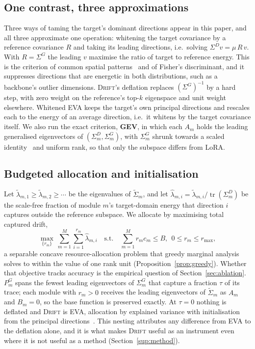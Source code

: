 \documentclass[conference]{IEEEtran}
\newcommand{\method}{\textsc{Drift}}
\newcommand{\tr}{\operatorname{tr}}
\begin{document}
\subsection{One contrast, three approximations}
\label{sec:family}

Three ways of taming the target's dominant directions appear in this paper, and
all three approximate one operation: whitening the target covariance by a
reference covariance $R$ and taking its leading directions, i.e.\ solving
$\Sigma^{D} v = \mu\, R\, v$. With $R = \Sigma^{G}$ the leading $v$ maximise the
ratio of target to reference energy. This is the criterion of common spatial
patterns~\cite{koles1990csp,ramoser2000csp} and of Fisher's discriminant, and it
suppresses directions that are energetic in both distributions, such as a
backbone's outlier dimensions. \method{}'s deflation replaces $(\Sigma^{G})^{-1}$
by a hard step, with zero weight on the reference's top-$k$ eigenspace and unit
weight elsewhere. Whitened EVA keeps the target's own principal directions and
rescales each to the energy of an average direction, i.e.\ it whitens by the
target covariance itself. We also run the exact criterion, \textbf{GEV}, in
which each $A_m$ holds the leading generalised eigenvectors of
$(\Sigma^{D}_m, \Sigma^{G}_m)$, with $\Sigma^{G}_m$ shrunk towards a scaled
identity~\cite{ledoit2004shrinkage} and uniform rank, so that only the subspace
differs from LoRA.

\subsection{Budgeted allocation and initialisation}
\label{sec:alloc}

Let $\widetilde{\lambda}_{m,1} \ge \widetilde{\lambda}_{m,2} \ge \cdots$ be the
eigenvalues of $\widetilde{\Sigma}_m$, and let
$\hat{\lambda}_{m,i} = \widetilde{\lambda}_{m,i}/\tr(\Sigma^{D}_m)$ be the
scale-free fraction of module $m$'s target-domain energy that direction $i$
captures outside the reference subspace. We allocate by maximising total captured
drift,
\begin{equation}
\max_{\{r_m\}} \ \sum_{m=1}^{M} \sum_{i=1}^{r_m} \hat{\lambda}_{m,i}
\quad \text{s.t.} \quad \sum_{m=1}^{M} r_m c_m \le B,\ \ 0 \le r_m \le r_{\max},
\label{eq:knapsack}
\end{equation}
a separable concave resource-allocation problem that greedy marginal analysis
solves to within the value of one rank unit (Proposition~\ref{prop:greedy}).
Whether that objective tracks accuracy is the empirical question of
Section~\ref{sec:ablation}. $P^{G}_m$ spans the fewest leading eigenvectors of
$\Sigma^{G}_m$ that capture a fraction $\tau$ of its trace; each module with
$r_m > 0$ receives the leading eigenvectors of $\widetilde{\Sigma}_m$ as $A_m$
and $B_m = 0$, so the base function is preserved exactly. At $\tau = 0$ nothing
is deflated and \method{} is EVA, allocation by explained variance with
initialisation from the principal directions~\cite{paischer2025eva}. This
nesting attributes any difference from EVA to the deflation alone, and it is what
makes \method{} useful as an instrument even where it is not useful as a method
(Section~\ref{sup:method}).
\end{document}
